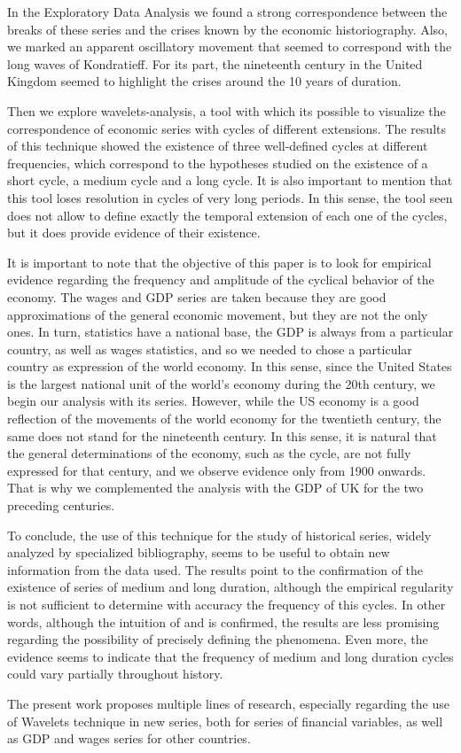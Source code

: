 \documentclass[a4paper]{article}
\begin{document}
In the Exploratory Data Analysis we found a strong correspondence between the breaks of these series and the crises known by the economic historiography. Also, we marked an apparent oscillatory movement that seemed to correspond with the long waves of Kondratieff. For its part, the nineteenth century in the United Kingdom seemed to highlight the crises around the 10 years of duration.

Then we explore wavelets-analysis, a tool with which its possible to visualize the correspondence of economic series with cycles of different extensions. The results of this technique showed the existence of three well-defined cycles at different frequencies, which correspond to the hypotheses studied on the existence of a short cycle, a medium cycle and a long cycle. It is also important to mention that this tool loses resolution in cycles of very long periods. In this sense, the tool seen does not allow to define exactly the temporal extension of each one of the cycles, but it does provide evidence of their existence.

It is important to note that the objective of this paper is to look for empirical evidence regarding the frequency and amplitude of the cyclical behavior of the economy. The wages and GDP series are taken because they are good approximations of the general economic movement, but they are not the only ones. In turn, statistics have a national base, the GDP is always from a particular country, as well as wages statistics, and so we needed to chose a particular country as expression of the world economy. In this sense, since the United States is the largest national unit of the world's economy during the 20th century, we begin our analysis with its series. However, while the US economy is a good reflection of the movements of the world economy for the twentieth century, the same does not stand for the nineteenth century. In this sense, it is natural that the general determinations of the economy, such as the cycle, are not fully expressed for that century, and we observe evidence only from 1900 onwards. That is why we complemented the analysis with the GDP of UK for the two preceding centuries.

To conclude, the use of this technique for the study of historical series, widely analyzed by specialized bibliography, seems to be useful to obtain new information from the data used. The results point to the confirmation of the existence of series of medium and long duration, although the empirical regularity is not sufficient to determine with accuracy the frequency of this cycles. In other words, although the intuition of \cite{kuznets1930secular} and \cite{kondratieff1979long} is confirmed, the results are less promising regarding the possibility of precisely defining the phenomena. Even more, the evidence seems to indicate that the frequency of medium and long duration cycles could vary partially throughout history.

The present work proposes multiple lines of research, especially regarding the use of Wavelets technique in new series, both for series of financial variables, as well as GDP and wages series for other countries.


\end{document}
